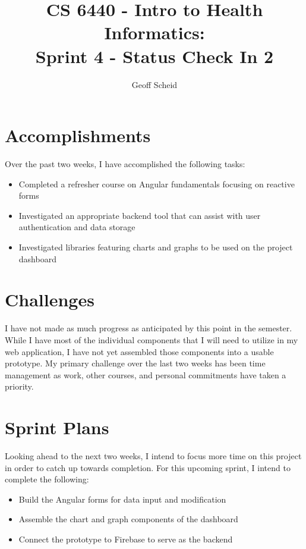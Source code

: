 \documentclass[letterpaper]{jdf}
\author{Geoff Scheid}
\title{CS 6440 - Intro to Health Informatics:\\Sprint 4 - Status Check In 2}
\begin{document}
\maketitle

\section{Accomplishments}
Over the past two weeks, I have accomplished the following tasks:
\begin{itemize}
    \item Completed a refresher course on Angular fundamentals focusing on reactive forms 
    \item Investigated an appropriate backend tool that can assist with user authentication and data storage
    \item Investigated libraries featuring charts and graphs to be used on the project dashboard
\end{itemize}

\section{Challenges}
I have not made as much progress as anticipated by this point in the semester.
While I have most of the individual components that I will need to utilize in my web application,
I have not yet assembled those components into a usable prototype.
My primary challenge over the last two weeks has been time management as work, other courses, and personal commitments have taken a priority.

\section{Sprint Plans}
Looking ahead to the next two weeks, I intend to focus more time on this project in order to catch up towards completion.
For this upcoming sprint, I intend to complete the following:
\begin{itemize}
    \item Build the Angular forms for data input and modification
    \item Assemble the chart and graph components of the dashboard
    \item Connect the prototype to Firebase to serve as the backend
\end{itemize}
\end{document}
